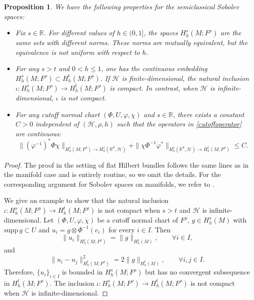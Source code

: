 \documentclass[11pt,oneside,reqno]{amsart}
\newcommand\R{\ensuremath{\mathbb{R}}}
\newtheorem{proposition}[theorem]{Proposition}
\theoremstyle{definition}
\numberwithin{equation}{section}
\theoremstyle{plain}
\begin{document}
\begin{proposition}\label{inclusionofSobolev}
    We have the following properties for the semiclassical Sobolev spaces:
    \begin{itemize}
        \item[(a)] Fix $s\in \mathbb{R}$. For different values of $h\in (0,1]$, the spaces $H^s_h(M;F^\rho)$ are the same sets with different norms. These norms are mutually equivalent, but the equivalence is not uniform with respect to $h$.
        \item[(b)] For any $s>t$ and $0<h \leq 1$, one has the continuous embedding $H^{s}_{h}(M;F^{\rho})\subset H^{t}_{h}(M;F^{\rho})$. If $\mathcal{H}$ is finite-dimensional, the natural inclusion $\iota: H^{s}_{h}(M;F^{\rho})\rightarrow H^{t}_{h}(M;F^{\rho})$ is compact. In contrast, when $\mathcal{H}$ is infinite-dimensional, $\iota$ is not compact.
        \item[(c)] For any cutoff normal chart $(\Phi,U,\varphi,\chi)$ and $s\in \R$, there exists a constant $C>0$ independent of $(\mathcal{H},\rho,h)$ such that the operators in \eqref{cutoffoperator} are continuous:
\begin{equation}\label{sobolevnormofcutoff}
\|(\varphi^{-1})^*\Phi \chi\|_{H^{s}_h(M;F^{\rho})\to H^{s}_h(\R^d,\mathcal{H})} +\|\chi\Phi^{-1}\varphi^*\|_{ H^{s}_h(\R^d,\mathcal{H})\to H^{s}_h(M;F^{\rho})}\leq C.
\end{equation}
\end{itemize}
\end{proposition}
\begin{proof}
    The proof in the setting of flat Hilbert bundles follows the same lines as in the manifold case and is entirely routine, so we omit the details. For the corresponding argument for Sobolev spaces on manifolds, we refer to \cite[Appendix E]{dyatlovzworski2019resonances}.
    
    We give an example to show that the natural inclusion $\iota: H^{s}_{h}(M;F^{\rho})\rightarrow H^{t}_{h}(M;F^{\rho})$ is not compact when $s>t$ and $\mathcal{H}$ is infinite-dimensional. Let $(\Phi,U,\varphi,\chi)$ be a cutoff normal chart of $F^\rho$, $g \in H^{s}_{h}(M)$ with $\mathrm{supp}\,g \subset U$ and $u_i = g \otimes  \Phi^{-1}( e_i)$ for every $i \in I$. Then 
    \begin{equation*}
        \|u_i \|_{H^{s}_h(M;F^{\rho})} = \| g \|_{H^s_h(M)}, \qquad \forall i \in I,
    \end{equation*}
    and
    \begin{equation*}
        \|u_i -u_j \|^2_{H^{t}_h(M;F^{\rho})}  = 2\| g \|_{H^t_h(M)} ,\qquad \forall i,j\in I.
    \end{equation*}
    Therefore, $\{u_i\}_{i\in I}$ is bounded in $H^{s}_h(M;F^{\rho})$ but has no convergent subsequence in $H^{t}_h(M;F^{\rho})$. The inclusion $\iota: H^{s}_{h}(M;F^{\rho})\rightarrow H^{t}_{h}(M;F^{\rho})$ is not compact when $\mathcal{H}$ is infinite-dimensional.
\end{proof}
\end{document}
